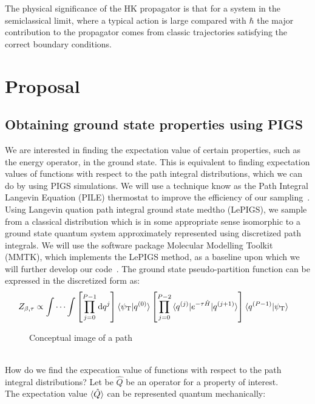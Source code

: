 \documentclass[12pt,letterpaper,oneside,final,titlepage]{article}               %
\numberwithin{equation}{section} %
\newcommand{\psiT}{\psi_{\textrm{T}}}
\newcommand{\eTH}{e^{-\tau\hat{H}}}
\begin{document}
The physical significance of the HK propagator is that for a system in the semiclassical limit, where a typical action is large compared with $\hbar$ the major contribution to the propagator comes from classic trajectories satisfying the correct boundary conditions.




\section{Proposal}
\subsection{Obtaining ground state properties using PIGS}
We are interested in finding the expectation value of certain properties, such as the energy operator, in the ground state. 
This is equivalent to finding expectation values of functions with respect to the path integral distributions, which we can do by using PIGS simulations.
We will use a technique know as the Path Integral Langevin Equation (PILE) thermostat to improve the efficiency of our sampling~\cite{constable2013langevin}.
Using Langevin quation path integral ground state medtho (LePIGS), 
we sample from a classical distribution which is in some appropriate sense isomorphic to a ground state quantum system approximately represented
using discretized path integrals. 
We will use the software package Molecular Modelling Toolkit (MMTK), which implements the LePIGS method, as a baseline upon which we will further develop our code~\cite{hinsen2000molecular}. 
The ground state pseudo-partition function can be expressed in the discretized form as:
\begin{align*}
    Z_{\beta,\tau}
    &\propto \idotsint  \left[ \prod_{j=0}^{P-1} \dif q^{j}                      \right]
                        \braket{\psiT|q^{(0)}}
                        \left[ \prod_{j=0}^{P-2} \braket{q^{(j)}|\eTH|q^{(j+1)}} \right]
                        \braket{q^{(P-1)}|\psiT}
\end{align*}
\begin{figure}[h]
    \caption{Conceptual image of a path}
\end{figure} \\
How do we find the expecation value of functions with respect to the path integral distributions? 
Let be $\hat{Q}$ be an operator for a property of interest. \\
The expectation value $\braket{\hat{Q}}$ can be represented quantum mechanically:
\end{document}
